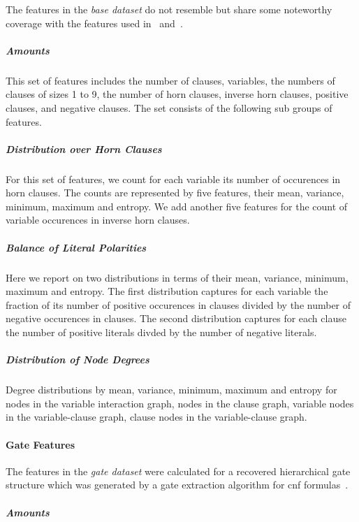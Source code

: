 \documentclass{easychair}
\theoremstyle{definition}
\begin{document}
The features in the \emph{base dataset} do not resemble but share some noteworthy coverage with the features used in~\cite{Xu:2008:SATzilla} and~\cite{Alfonso:2014:Features}. 

\subparagraph{Amounts}

This set of features includes the number of \textsf{clauses}, \textsf{variables}, the numbers of clauses of \textsf{sizes 1 to 9}, the number of \textsf{horn clauses}, \textsf{inverse horn clauses}, \textsf{positive clauses}, and \textsf{negative clauses}. 
The set consists of the following sub groups of features. 

\subparagraph{Distribution over Horn Clauses}

For this set of features, we count for each variable its number of occurences in horn clauses. 
The counts are represented by five features, their \textsf{mean}, \textsf{variance}, \textsf{minimum}, \textsf{maximum} and \textsf{entropy}. 
We add another five features for the count of variable occurences in inverse horn clauses. 

\subparagraph{Balance of Literal Polarities}

Here we report on two distributions in terms of their \textsf{mean}, \textsf{variance}, \textsf{minimum}, \textsf{maximum} and \textsf{entropy}. 
The first distribution captures for each variable the fraction of its number of positive occurences in clauses divided by the number of negative occurences in clauses. 
The second distribution captures for each clause the number of positive literals divded by the number of negative literals. 

\subparagraph{Distribution of Node Degrees}

Degree distributions by \textsf{mean}, \textsf{variance}, \textsf{minimum}, \textsf{maximum} and \textsf{entropy} for nodes in the variable interaction graph, nodes in the clause graph, variable nodes in the variable-clause graph, clause nodes in the variable-clause graph. 


\paragraph{Gate Features}
\label{sec:data:gate}

The features in the \emph{gate dataset} were calculated for a recovered hierarchical gate structure which was generated by a gate extraction algorithm for cnf formulas~\cite{Iser:2015:Gates,Iser:2020:Disse}. 

\subparagraph{Amounts}
\end{document}
